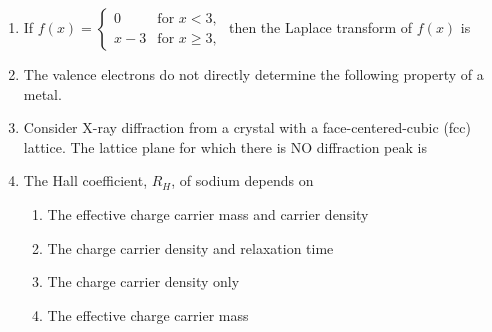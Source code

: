 \documentclass[journal,12pt,onecolumn]{IEEEtran}
\theoremstyle{remark}
\begin{document}
\begin{enumerate}
\item If $f(x)=\begin{cases}0& \text{for } x<3, \\ x-3& \text{for } x\ge3, \end{cases}$ then the Laplace transform of $f(x)$ is\hfill{}

\begin{enumerate}  \end{enumerate}

\item The valence electrons do not directly determine the following property of a metal.\hfill{}

\begin{enumerate}
\end{enumerate}

\item Consider X-ray diffraction from a crystal with a face-centered-cubic (fcc) lattice. The lattice plane for which there is NO diffraction peak is\hfill{}

\begin{enumerate}  \end{enumerate}

\item The Hall coefficient, $R_H$, of sodium depends on\hfill{}

\begin{enumerate}
\item The effective charge carrier mass and carrier density
\item The charge carrier density and relaxation time
\item The charge carrier density only
\item The effective charge carrier mass
\end{enumerate}


\end{enumerate}
\end{document}
